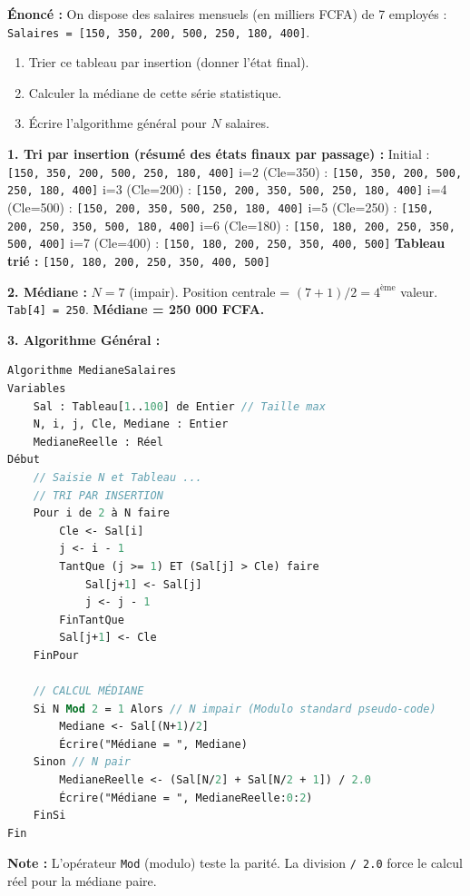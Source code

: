 \documentclass[11pt]{article}
\begin{document}
\begin{exoresolu}
\textbf{Énoncé :} On dispose des salaires mensuels (en milliers FCFA) de 7 employés : \texttt{Salaires = [150, 350, 200, 500, 250, 180, 400]}.
\begin{enumerate}
    \item Trier ce tableau par insertion (donner l'état final).
    \item Calculer la médiane de cette série statistique.
    \item Écrire l'algorithme général pour $N$ salaires.
\end{enumerate}
\tcblower
\textbf{1. Tri par insertion (résumé des états finaux par passage) :}
Initial : \texttt{[150, 350, 200, 500, 250, 180, 400]}
i=2 (Cle=350) : \texttt{[150, 350, 200, 500, 250, 180, 400]}
i=3 (Cle=200) : \texttt{[150, 200, 350, 500, 250, 180, 400]}
i=4 (Cle=500) : \texttt{[150, 200, 350, 500, 250, 180, 400]}
i=5 (Cle=250) : \texttt{[150, 200, 250, 350, 500, 180, 400]}
i=6 (Cle=180) : \texttt{[150, 180, 200, 250, 350, 500, 400]}
i=7 (Cle=400) : \texttt{[150, 180, 200, 250, 350, 400, 500]}
\textbf{Tableau trié :} \texttt{[150, 180, 200, 250, 350, 400, 500]}

\medskip
\textbf{2. Médiane :} $N=7$ (impair). Position centrale = $(7+1)/2 = 4^{\text{ème}}$ valeur.
\texttt{Tab[4] = 250}.
\textbf{Médiane = 250 000 FCFA.}

\medskip
\textbf{3. Algorithme Général :}
\begin{lstlisting}[language=Pascal]
Algorithme MedianeSalaires
Variables
    Sal : Tableau[1..100] de Entier // Taille max
    N, i, j, Cle, Mediane : Entier
    MedianeReelle : Réel
Début
    // Saisie N et Tableau ...
    // TRI PAR INSERTION
    Pour i de 2 à N faire
        Cle <- Sal[i]
        j <- i - 1
        TantQue (j >= 1) ET (Sal[j] > Cle) faire
            Sal[j+1] <- Sal[j]
            j <- j - 1
        FinTantQue
        Sal[j+1] <- Cle
    FinPour

    // CALCUL MÉDIANE
    Si N Mod 2 = 1 Alors // N impair (Modulo standard pseudo-code)
        Mediane <- Sal[(N+1)/2]
        Écrire("Médiane = ", Mediane)
    Sinon // N pair
        MedianeReelle <- (Sal[N/2] + Sal[N/2 + 1]) / 2.0
        Écrire("Médiane = ", MedianeReelle:0:2)
    FinSi
Fin
\end{lstlisting}
\textbf{Note :} L'opérateur \texttt{Mod} (modulo) teste la parité. La division \texttt{/ 2.0} force le calcul réel pour la médiane paire.
\end{exoresolu}
\end{document}
